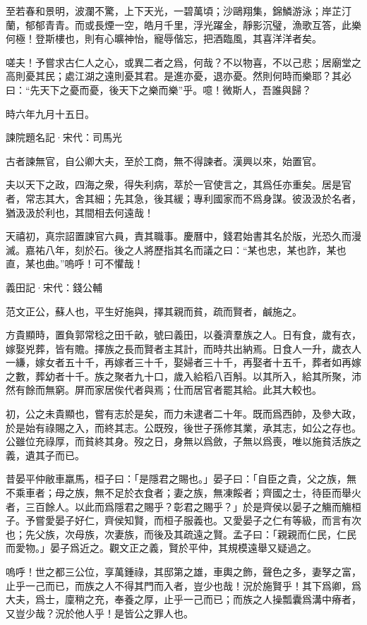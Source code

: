 \documentclass[12pt,a4paper]{ctexbook}
\begin{document}
至若春和景明，波瀾不驚，上下天光，一碧萬頃；沙鷗翔集，錦鱗游泳；岸芷汀蘭，郁郁青青。而或長煙一空，皓月千里，浮光躍金，靜影沉璧，漁歌互答，此樂何極！登斯樓也，則有心曠神怡，寵辱偕忘，把酒臨風，其喜洋洋者矣。\par
嗟夫！予嘗求古仁人之心，或異二者之爲，何哉？不以物喜，不以己悲；居廟堂之高則憂其民；處江湖之遠則憂其君。是進亦憂，退亦憂。然則何時而樂耶？其必曰：“先天下之憂而憂，後天下之樂而樂”乎。噫！微斯人，吾誰與歸？\par
時六年九月十五日。\par
諫院題名記·宋代：司馬光 \par
古者諫無官，自公卿大夫，至於工商，無不得諫者。漢興以來，始置官。\par
夫以天下之政，四海之衆，得失利病，萃於一官使言之，其爲任亦重矣。居是官者，常志其大，舍其細；先其急，後其緩；專利國家而不爲身謀。彼汲汲於名者，猶汲汲於利也，其間相去何遠哉！\par
天禧初，真宗詔置諫官六員，責其職事。慶曆中，錢君始書其名於版，光恐久而漫滅。嘉祐八年，刻於石。後之人將歷指其名而議之曰：“某也忠，某也詐，某也直，某也曲。”嗚呼！可不懼哉！\par
義田記·宋代：錢公輔 \par
范文正公，蘇人也，平生好施與，擇其親而貧，疏而賢者，鹹施之。\par
方貴顯時，置負郭常稔之田千畝，號曰義田，以養濟羣族之人。日有食，歲有衣，嫁娶兇葬，皆有贍。擇族之長而賢者主其計，而時共出納焉。日食人一升，歲衣人一縑，嫁女者五十千，再嫁者三十千，娶婦者三十千，再娶者十五千，葬者如再嫁之數，葬幼者十千。族之聚者九十口，歲入給稻八百斛。以其所入，給其所聚，沛然有餘而無窮。屏而家居俟代者與焉；仕而居官者罷其給。此其大較也。\par
初，公之未貴顯也，嘗有志於是矣，而力未逮者二十年。既而爲西帥，及參大政，於是始有祿賜之入，而終其志。公既歿，後世子孫修其業，承其志，如公之存也。公雖位充祿厚，而貧終其身。歿之日，身無以爲斂，子無以爲喪，唯以施貧活族之義，遺其子而已。\par
昔晏平仲敝車羸馬，桓子曰：「是隱君之賜也。」晏子曰：「自臣之貴，父之族，無不乘車者；母之族，無不足於衣食者；妻之族，無凍餒者；齊國之士，待臣而舉火者，三百餘人。以此而爲隱君之賜乎？彰君之賜乎？」於是齊侯以晏子之觴而觴桓子。予嘗愛晏子好仁，齊侯知賢，而桓子服義也。又愛晏子之仁有等級，而言有次也；先父族，次母族，次妻族，而後及其疏遠之賢。孟子曰：「親親而仁民，仁民而愛物。」晏子爲近之。觀文正之義，賢於平仲，其規模遠舉又疑過之。\par
嗚呼！世之都三公位，享萬鍾祿，其邸第之雄，車輿之飾，聲色之多，妻孥之富，止乎一己而已，而族之人不得其門而入者，豈少也哉！況於施賢乎！其下爲卿，爲大夫，爲士，廩稍之充，奉養之厚，止乎一己而已；而族之人操瓢囊爲溝中瘠者，又豈少哉？況於他人乎！是皆公之罪人也。\par
\end{document}
